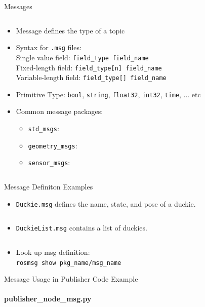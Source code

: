 \documentclass[aspectratio=43]{beamer}
\newcommand{\inline}[1]{\texttt{#1}}
\begin{document}
\begin{frame}{Messages}
	\begin{columns}
		\begin{column}{0.7\textwidth}
			\begin{itemize}
				\item Message defines the type of a topic
				\item Syntax for \texttt{.msg} files:\\%
					Single value field: \inline{field_type field_name}\\%
					Fixed-length field: \inline{field_type[n] field_name}\\%
					Variable-length field: \inline{field_type[] field_name}
				\item Primitive Type: \inline{bool}, \inline{string}, \inline{float32}, \inline{int32}, \inline{time}, ... etc
				\item Common message packages:
					\begin{itemize}
						\item \inline{std_msgs}: 
						\item \inline{geometry_msgs}:
						\item \inline{sensor_msgs}:
					\end{itemize}
			\end{itemize}
		\end{column}
		\begin{column}{0.3\textwidth}
			\centering
		\end{column}
	\end{columns}
\end{frame}


\begin{frame}{Message Definiton Examples}
	\begin{itemize}
		\item \texttt{Duckie.msg} defines the name, state, and pose of a duckie.
		\inputminted{python}{snippet/Duckie.msg}
		\item \texttt{DuckieList.msg} contains a list of duckies.
		\inputminted{python}{snippet/DuckieList.msg}
		\item Look up msg definition:\\\inline{rosmsg show pkg_name/msg_name}
	\end{itemize}
\end{frame}

\begin{frame}{Message Usage in Publisher Code Example}
	\framesubtitle{publisher\_node\_msg.py}
	\inputminted{python}{snippet/publisher_node_msg.py}
\end{frame}
\end{document}

